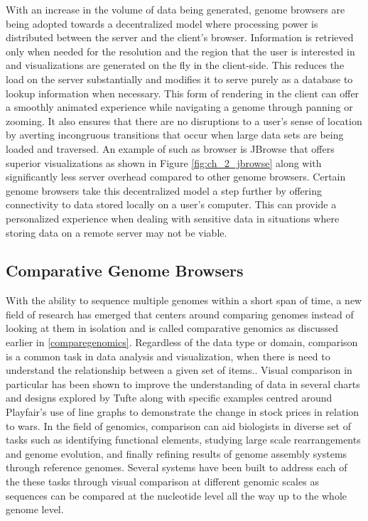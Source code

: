 With an increase in the volume of data being generated, genome browsers are being adopted towards a decentralized model where processing power is distributed between the server and the client's browser. Information is retrieved only when needed for the resolution and the region that the user is interested in and visualizations are generated on the fly in the client-side. This reduces the load on the server substantially and modifies it to serve purely as a database to lookup information when necessary. This form of rendering in the client can offer a smoothly animated experience while navigating a genome through panning or zooming. It also ensures that there are no disruptions to a user's sense of location by averting incongruous transitions that occur when large data sets are being loaded and traversed. An example of such as browser is JBrowse that offers superior visualizations as shown in Figure \ref{fig:ch_2_jbrowse} along with significantly less server overhead compared to other genome browsers\cite{skinner2009jbrowse}.
Certain genome browsers take this decentralized model a step further by offering connectivity to data stored locally on a user's computer\cite{ucscgenome,saito2009utgb}. This can provide a personalized experience when dealing with sensitive data in situations where storing data on a remote server may not be viable. 

\subsection{Comparative Genome Browsers}
With the ability to sequence multiple genomes within a short span of time, a new field of research has emerged that centers around comparing genomes instead of looking at them in isolation and is called comparative genomics as discussed earlier in \ref{comparegenomics}. Regardless of the data type or domain, comparison is a common task in data analysis and visualization, when there is need to understand the relationship between a given set of items.\cite{gleicher2017considerations}. Visual comparison in particular has been shown to improve the understanding of data in several charts and designs explored by Tufte\cite{tufte1990envisioning} along with specific examples centred around Playfair's use of line graphs to demonstrate the change in stock prices in relation to wars\cite{costigan1990william}. In the field of genomics, comparison can aid biologists in diverse set of tasks such as identifying functional elements, studying large scale rearrangements and genome evolution, and finally refining results of genome assembly systems through reference genomes\cite{nielsen2010visualizing}. Several systems have been built to address each of the these tasks through visual comparison at different genomic scales as sequences can be compared at the nucleotide level all the way up to the whole genome level.


